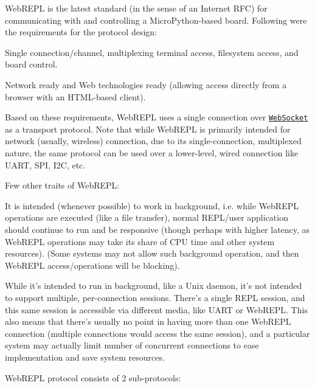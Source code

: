 Web\-R\-E\-P\-L is the latest standard (in the sense of an Internet R\-F\-C) for communicating with and controlling a Micro\-Python-\/based board. Following were the requirements for the protocol design\-:


\begin{DoxyEnumerate}
\item Single connection/channel, multiplexing terminal access, filesystem access, and board control.
\item Network ready and Web technologies ready (allowing access directly from a browser with an H\-T\-M\-L-\/based client).
\end{DoxyEnumerate}

Based on these requirements, Web\-R\-E\-P\-L uses a single connection over \href{https://en.wikipedia.org/wiki/WebSocket}{\tt Web\-Socket} as a transport protocol. Note that while Web\-R\-E\-P\-L is primarily intended for network (usually, wireless) connection, due to its single-\/connection, multiplexed nature, the same protocol can be used over a lower-\/level, wired connection like U\-A\-R\-T, S\-P\-I, I2\-C, etc.

Few other traits of Web\-R\-E\-P\-L\-:


\begin{DoxyEnumerate}
\item It is intended (whenever possible) to work in background, i.\-e. while Web\-R\-E\-P\-L operations are executed (like a file transfer), normal R\-E\-P\-L/user application should continue to run and be responsive (though perhaps with higher latency, as Web\-R\-E\-P\-L operations may take its share of C\-P\-U time and other system resources). (Some systems may not allow such background operation, and then Web\-R\-E\-P\-L access/operations will be blocking).
\item While it's intended to run in background, like a Unix daemon, it's not intended to support multiple, per-\/connection sessions. There's a single R\-E\-P\-L session, and this same session is accessible via different media, like U\-A\-R\-T or Web\-R\-E\-P\-L. This also means that there's usually no point in having more than one Web\-R\-E\-P\-L connection (multiple connections would access the same session), and a particular system may actually limit number of concurrent connections to ease implementation and save system resources.
\end{DoxyEnumerate}

Web\-R\-E\-P\-L protocol consists of 2 sub-\/protocols\-:


